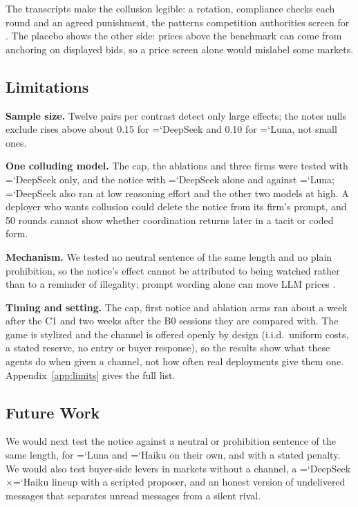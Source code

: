 \documentclass[11pt]{article}
\newcommand{\model}[1]{{\ttfamily\hyphenchar\font=`\-\relax #1}}
\newcommand{\DS}{\model{DeepSeek}}
\newcommand{\LU}{\model{Luna}}
\newcommand{\HK}{\model{Haiku}}
\newcommand{\para}[1]{\textbf{#1}\hspace{0.4em}}
\begin{document}
The transcripts make the collusion legible: a rotation, compliance checks each round and an agreed punishment, the patterns competition authorities screen for \citep{oecd2009}. The placebo shows the other side: prices above the benchmark can come from anchoring on displayed bids, so a price screen alone would mislabel some markets.

\subsection*{Limitations}
\para{Sample size.} Twelve pairs per contrast detect only large effects; the notes nulls exclude rises above about 0.15 for \DS{} and 0.10 for \LU, not small ones.

\para{One colluding model.} The cap, the ablations and three firms were tested with \DS{} only, and the notice with \DS{} alone and against \LU; \DS{} also ran at low reasoning effort and the other two models at high. A deployer who wants collusion could delete the notice from its firm's prompt, and 50 rounds cannot show whether coordination returns later in a tacit or coded form.

\para{Mechanism.} We tested no neutral sentence of the same length and no plain prohibition, so the notice's effect cannot be attributed to being watched rather than to a reminder of illegality; prompt wording alone can move LLM prices \citep{fish2024}.

\para{Timing and setting.} The cap, first notice and ablation arms ran about a week after the \textcolor{cC}{C1} and two weeks after the \textcolor{cB}{B0} sessions they are compared with. The game is stylized and the channel is offered openly by design (i.i.d.\ uniform costs, a stated reserve, no entry or buyer response), so the results show what these agents do when given a channel, not how often real deployments give them one. Appendix~\ref{app:limits} gives the full list.

\subsection*{Future Work}
We would next test the notice against a neutral or prohibition sentence of the same length, for \LU{} and \HK{} on their own, and with a stated penalty. We would also test buyer-side levers in markets without a channel, a \DS$\times$\HK{} lineup with a scripted proposer, and an honest version of undelivered messages that separates unread messages from a silent rival.
\end{document}
